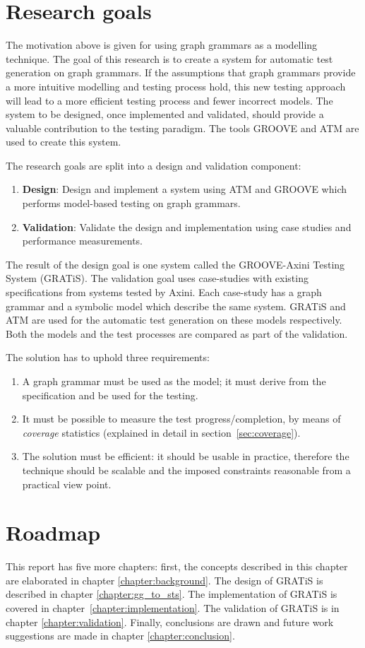 \section{Research goals}\label{sec:goals}
The motivation above is given for using graph grammars as a modelling technique. The goal of this research is to create a system for automatic test generation on graph grammars. If the assumptions that graph grammars provide a more intuitive modelling and testing process hold, this new testing approach will lead to a more efficient testing process and fewer incorrect models. The system to be designed, once implemented and validated, should provide a valuable contribution to the testing paradigm. The tools GROOVE and ATM are used to create this system.

The research goals are split into a design and validation component:
\begin{enumerate}
    \item \textbf{Design}: Design and implement a system using ATM and GROOVE which performs model-based testing on graph grammars.
    \item \textbf{Validation}: Validate the design and implementation using case studies and performance measurements.
\end{enumerate}

The result of the design goal is one system called the GROOVE-Axini Testing System (GRATiS). The validation goal uses case-studies with existing specifications from systems tested by Axini. Each case-study has a graph grammar and a symbolic model which describe the same system. GRATiS and ATM are used for the automatic test generation on these models respectively. Both the models and the test processes are compared as part of the validation.

The solution has to uphold three requirements:
\begin{enumerate}
\item A graph grammar must be used as the model; it must derive from the specification and be used for the testing.
\item It must be possible to measure the test progress/completion, by means of \textit{coverage} statistics (explained in detail in section~\ref{sec:coverage}).
\item The solution must be efficient: it should be usable in practice, therefore the technique should be scalable and the imposed constraints reasonable from a practical view point.
\end{enumerate}

\section{Roadmap}
This report has five more chapters: first, the concepts described in this chapter are elaborated in chapter \ref{chapter:background}. The design of GRATiS is described in chapter \ref{chapter:gg_to_sts}. The implementation of GRATiS is covered in chapter~\ref{chapter:implementation}. The validation of GRATiS is in chapter \ref{chapter:validation}. Finally, conclusions are drawn and future work suggestions are made in chapter \ref{chapter:conclusion}.
